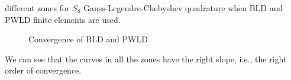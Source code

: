 different zones for $S_8$ Gauss-Legendre-Chebyshev quadrature when BLD and PWLD 
finite elements are used.
\begin{figure}[H]
  \centering
  \caption{Convergence of BLD and PWLD}
\end{figure}
We can see that the curves in all the zones have the right slope, i.e.,
the right order of convergence.
